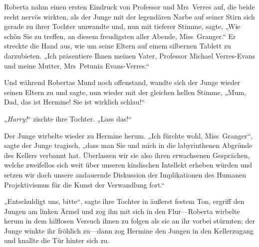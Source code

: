Roberta nahm einen ersten Eindruck von Professor und Mrs~Verres auf, die beide recht nervös wirkten, als der Junge mit der legendären Narbe auf seiner Stirn sich gerade zu ihrer Tochter umwandte und, nun mit tieferer Stimme, sagte, „Wie schön Sie zu treffen, an diesem freudigsten aller Abende, Miss~Granger.“ Er streckte die Hand aus, wie um seine Eltern auf einem silbernen Tablett zu darzubieten. „Ich präsentiere Ihnen meinen Vater, Professor Michael Verres-Evans und meine Mutter, Mrs~Petunia Evans-Verres.“

Und während Robertas Mund noch offenstand, wandte sich der Junge wieder seinen Eltern zu und sagte, nun wieder mit der gleichen hellen Stimme, „Mum, Dad, das ist Hermine! Sie ist wirklich schlau!“

„\emph{Harry!}“ zischte ihre Tochter. „Lass das!“

Der Junge wirbelte wieder zu Hermine herum. „Ich fürchte wohl, Miss~Granger“, sagte der Junge tragisch, „dass man Sie und mich in die labyrinthenen Abgründe des Kellers verbannt hat. Überlassen wir sie also ihren erwachsenen Gesprächen, welche zweifellos sich weit über unseren kindischen Intellekt erheben würden und setzen wir doch unsere andauernde Diskussion der Implikationen des Humanen Projektivismus für die Kunst der Verwandlung fort.“

„Entschuldigt uns, bitte“, sagte ihre Tochter in äußerst festem Ton, ergriff den Jungen am linken Ärmel und zog ihn mit sich in den Flur—Roberta wirbelte herum in dem hilflosen Versuch ihnen zu folgen als sie an ihr vorbei stürmten; der Junge winkte ihr fröhlich zu—dann zog Hermine den Jungen in den Kellerzugang und knallte die Tür hinter sich zu.

